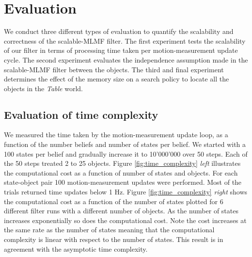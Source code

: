 


\section{Evaluation}\label{ch5:evaluation}

We conduct three different types of evaluation to quantify the scalability and correctness of the scalable-MLMF filter. The first experiment
tests the scalability of our filter in terms of processing time taken per motion-measurement update cycle. The second experiment evaluates the independence 
assumption made in the scalable-MLMF filter between the objects. The third and final experiment determines the effect of the 
memory size on a search policy to locate all the objects in the \textit{Table} world.

\subsection{Evaluation of time complexity}

We measured the time taken by the motion-measurement update loop, as a function of the number beliefs and number of states per belief. 
We started with a 100 states per belief and gradually increase it to 10'000'000 over 50 steps. Each of the 50 steps treated 2 to 25  objects. 
Figure \ref{fig:time_complexity} \textit{left} illustrates the computational
cost as a function of number of states and objects. For each state-object pair 100 motion-measurement updates were performed. Most of the trials returned time updates 
below 1 Hz. Figure \ref{fig:time_complexity} \textit{right} shows the computational cost as a function of the number of states plotted for 6 different filter runs with
a different number of objects. As the number of states increases exponentially so does the computational cost. Note the cost increases at the same
rate as the number of states meaning that the computational complexity is linear with respect to the number of states. This result is in agreement with 
the asymptotic time complexity.

